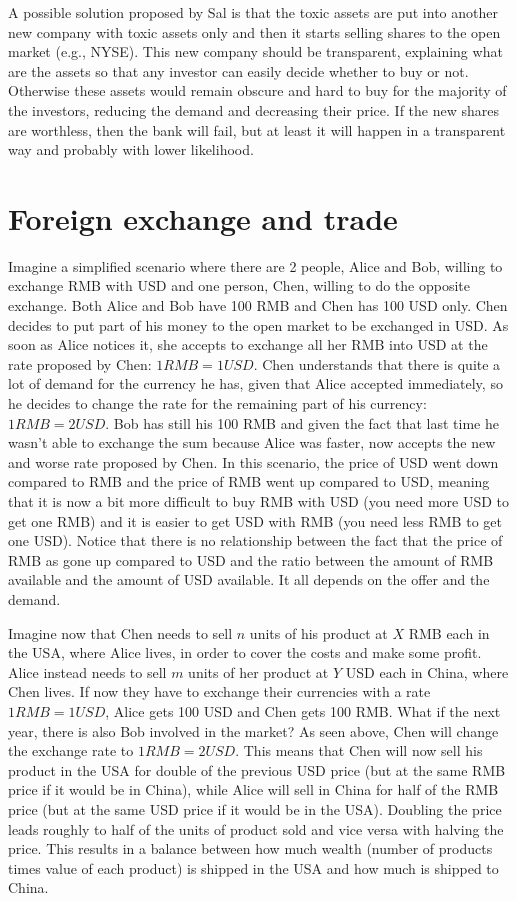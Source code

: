 A possible solution proposed by Sal is that the toxic assets are put into another new company with toxic assets only and then it starts selling shares to the open market (e.g., NYSE). This new company should be transparent, explaining what are the assets so that any investor can easily decide whether to buy or not. Otherwise these assets would remain obscure and hard to buy for the majority of the investors, reducing the demand and decreasing their price. If the new shares are worthless, then the bank will fail, but at least it will happen in a transparent way and probably with lower likelihood.

\section{Foreign exchange and trade}
Imagine a simplified scenario where there are 2 people, Alice and Bob, willing to exchange RMB with USD and one person, Chen, willing to do the opposite exchange. Both Alice and Bob have 100 RMB and Chen has 100 USD only. Chen decides to put part of his money to the open market to be exchanged in USD. As soon as Alice notices it, she accepts to exchange all her RMB into USD at the rate proposed by Chen: $1 RMB = 1 USD$. Chen understands that there is quite a lot of demand for the currency he has, given that Alice accepted immediately, so he decides to change the rate for the remaining part of his currency: $1 RMB = 2 USD$. Bob has still his 100 RMB and given the fact that last time he wasn't able to exchange the sum because Alice was faster, now accepts the new and worse rate proposed by Chen. In this scenario, the price of USD went down compared to RMB and the price of RMB went up compared to USD, meaning that it is now a bit more difficult to buy RMB with USD (you need more USD to get one RMB) and it is easier to get USD with RMB (you need less RMB to get one USD). Notice that there is no relationship between the fact that the price of RMB as gone up compared to USD and the ratio between the amount of RMB available and the amount of USD available. It all depends on the offer and the demand.

Imagine now that Chen needs to sell $n$ units of his product at $X$ RMB each in the USA, where Alice lives, in order to cover the costs and make some profit. Alice instead needs to sell $m$ units of her product at $Y$ USD each in China, where Chen lives. If now they have to exchange their currencies with a rate $1 RMB = 1 USD$, Alice gets 100 USD and Chen gets 100 RMB. What if the next year, there is also Bob involved in the market? As seen above, Chen will change the exchange rate to $1 RMB = 2 USD$. This means that Chen will now sell his product in the USA for double of the previous USD price (but at the same RMB price if it would be in China), while Alice will sell in China for half of the RMB price (but at the same USD price if it would be in the USA). Doubling the price leads roughly to half of the units of product sold and vice versa with halving the price. This results in a balance between how much wealth (number of products times value of each product) is shipped in the USA and how much is shipped to China.


